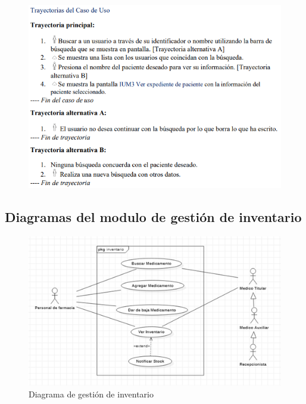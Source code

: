 \documentclass[12pt,letterpaper]{article}
\begin{document}
            \begin{figure}[H]
                \centering
                \includegraphics [scale=0.9]{specs/trayVerPaciente}
            \end{figure}
        
            \newpage
        \subsection{Diagramas del modulo de gestión de inventario}
            \begin{figure}[H]
                \centering
                \includegraphics [scale=0.8]{casosUso/gestionInventario}
                \caption{Diagrama de gestión de inventario}
            \end{figure}
\end{document}
